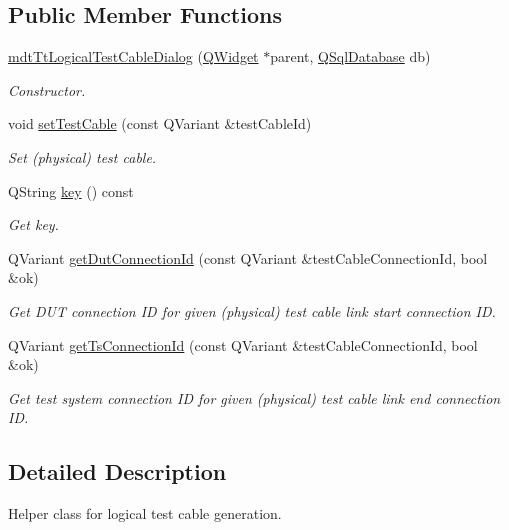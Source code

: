 \subsection*{Public Member Functions}
\begin{DoxyCompactItemize}
\item 
\hyperlink{classmdt_tt_logical_test_cable_dialog_a4f9bd2e6a879ef758790a3dbe7323327}{mdt\-Tt\-Logical\-Test\-Cable\-Dialog} (\hyperlink{class_q_widget}{Q\-Widget} $\ast$parent, \hyperlink{class_q_sql_database}{Q\-Sql\-Database} db)
\begin{DoxyCompactList}\small\item\em Constructor. \end{DoxyCompactList}\item 
void \hyperlink{classmdt_tt_logical_test_cable_dialog_a445118bbecbb409f0932ea5421db5dea}{set\-Test\-Cable} (const Q\-Variant \&test\-Cable\-Id)
\begin{DoxyCompactList}\small\item\em Set (physical) test cable. \end{DoxyCompactList}\item 
Q\-String \hyperlink{classmdt_tt_logical_test_cable_dialog_a850bd0b434de80b97a62b57fe5f464cc}{key} () const 
\begin{DoxyCompactList}\small\item\em Get key. \end{DoxyCompactList}\item 
Q\-Variant \hyperlink{classmdt_tt_logical_test_cable_dialog_aa53b013adee0c102f504a915e37aeda4}{get\-Dut\-Connection\-Id} (const Q\-Variant \&test\-Cable\-Connection\-Id, bool \&ok)
\begin{DoxyCompactList}\small\item\em Get D\-U\-T connection I\-D for given (physical) test cable link start connection I\-D. \end{DoxyCompactList}\item 
Q\-Variant \hyperlink{classmdt_tt_logical_test_cable_dialog_acd37723b57c66a56e868acca09688c3e}{get\-Ts\-Connection\-Id} (const Q\-Variant \&test\-Cable\-Connection\-Id, bool \&ok)
\begin{DoxyCompactList}\small\item\em Get test system connection I\-D for given (physical) test cable link end connection I\-D. \end{DoxyCompactList}\end{DoxyCompactItemize}


\subsection{Detailed Description}
Helper class for logical test cable generation. 

